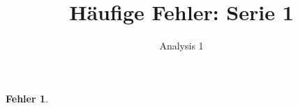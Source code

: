 \documentclass{article}
\title{Häufige Fehler: Serie 1}
\author{Analysis 1}
\theoremstyle{definition}
\newtheorem{mistake}{Fehler}[section]
\begin{document}
\maketitle

\section{}
\begin{mistake}
\end{mistake}

\section{}

\section{}

\section{}

\section{}
\end{document}
